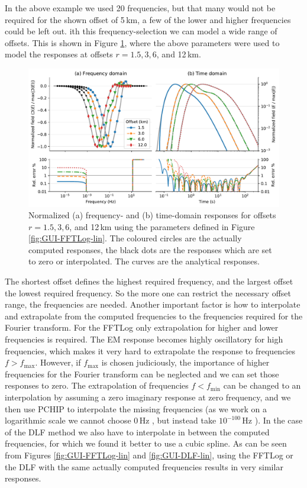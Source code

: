 \documentclass[onecolumn,extra,referee,camera]{gji}
\newlength{\fwidth}
\begin{document}
%
In the above example we used 20 frequencies, but that many would not be
required for the shown offset of 5\,km, a few of the lower and higher
frequencies could be left out.  ith this frequency-selection
we can model a wide range of offsets. This is shown in Figure
\ref{fig:multi-offset}, where the above parameters were used to model the
responses at offsets $r=1.5,3,6$, and 12\,km.
%
\begin{figure}
  \centering
  \includegraphics[width=0.75\fwidth]{03-multi-offset}
  \caption{Normalized (a) frequency- and (b) time-domain responses for offsets
    $r=1.5,3,6$, and 12\,km using the parameters defined in Figure
    \ref{fig:GUI-FFTLog-lin}. The coloured circles are the actually computed
    responses, the black dots are the responses which are set to zero or
    interpolated. The  curves are the analytical
    responses.}
  \label{fig:multi-offset}
\end{figure}
%

The shortest offset defines the highest required frequency, and the largest
offset the lowest required frequency. So the more one can restrict the
necessary offset range, the  frequencies are needed.
Another important factor is how to interpolate and extrapolate from the
computed frequencies to the frequencies required for the Fourier transform. For
the FFTLog only extrapolation for higher and lower frequencies is required. The
EM response becomes highly oscillatory for high frequencies, which makes it
very hard to extrapolate the response to frequencies $f>f_\mathrm{max}$.
However, if $f_\mathrm{max}$ is chosen judiciously, the importance of higher
frequencies for the Fourier transform can be neglected and we can set those
responses to zero. The extrapolation of frequencies $f<f_\mathrm{min}$ can be
changed to an interpolation by assuming a zero imaginary response at zero
frequency, and we then use PCHIP to interpolate the missing frequencies (as we
work on a logarithmic scale we cannot choose 0\,Hz , but
instead take $10^{-100}$\,Hz ). In the case of the
DLF method we also have to interpolate in between the computed frequencies, for
which we found it better to use a cubic spline. As can be seen from Figures
\ref{fig:GUI-FFTLog-lin} and \ref{fig:GUI-DLF-lin}, using the FFTLog or the DLF
with the same actually computed frequencies results in very similar responses.
\end{document}
